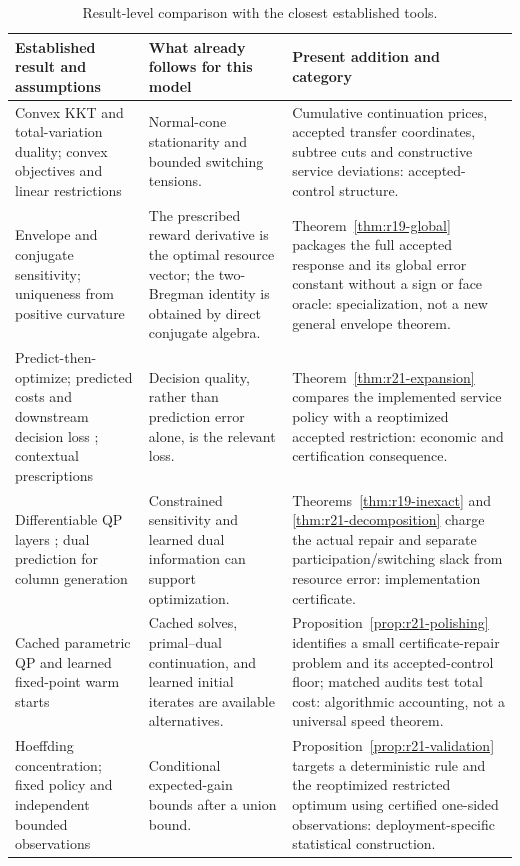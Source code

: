 \begin{table}[tbp]\centering\small
\caption{Result-level comparison with the closest established tools.}
\label{tab:r21-novelty}
\begin{tabular}{p{}p{}p{}}
\toprule
Established result and assumptions & What already follows for this model & Present addition and category\\
\midrule
Convex KKT and total-variation duality; convex objectives and linear restrictions \citep{BoydVandenberghe2004,TibshiraniTaylor2011}
& Normal-cone stationarity and bounded switching tensions.
& Cumulative continuation prices, accepted transfer coordinates, subtree cuts and constructive service deviations: accepted-control structure.\\
Envelope and conjugate sensitivity; uniqueness from positive curvature \citep{BoydVandenberghe2004}
& The prescribed reward derivative is the optimal resource vector; the two-Bregman identity is obtained by direct conjugate algebra.
& Theorem~\ref{thm:r19-global} packages the full accepted response and its global error constant without a sign or face oracle: specialization, not a new general envelope theorem.\\
Predict-then-optimize; predicted costs and downstream decision loss \citep{ElmachtoubGrigas2022}; contextual prescriptions \citep{BertsimasKallus2020}
& Decision quality, rather than prediction error alone, is the relevant loss.
& Theorem~\ref{thm:r21-expansion} compares the implemented service policy with a reoptimized accepted restriction: economic and certification consequence.\\
Differentiable QP layers \citep{AmosKolter2017}; dual prediction for column generation \citep{KraulSeizingerBrunner2023}
& Constrained sensitivity and learned dual information can support optimization.
& Theorems~\ref{thm:r19-inexact} and \ref{thm:r21-decomposition} charge the actual repair and separate participation/switching slack from resource error: implementation certificate.\\
Cached parametric QP and learned fixed-point warm starts \citep{Stellato2020,Sambharya2024}
& Cached solves, primal--dual continuation, and learned initial iterates are available alternatives.
& Proposition~\ref{prop:r21-polishing} identifies a small certificate-repair problem and its accepted-control floor; matched audits test total cost: algorithmic accounting, not a universal speed theorem.\\
Hoeffding concentration; fixed policy and independent bounded observations \citep{Hoeffding1963}
& Conditional expected-gain bounds after a union bound.
& Proposition~\ref{prop:r21-validation} targets a deterministic rule and the reoptimized restricted optimum using certified one-sided observations: deployment-specific statistical construction.\\
\bottomrule
\end{tabular}
\end{table}
